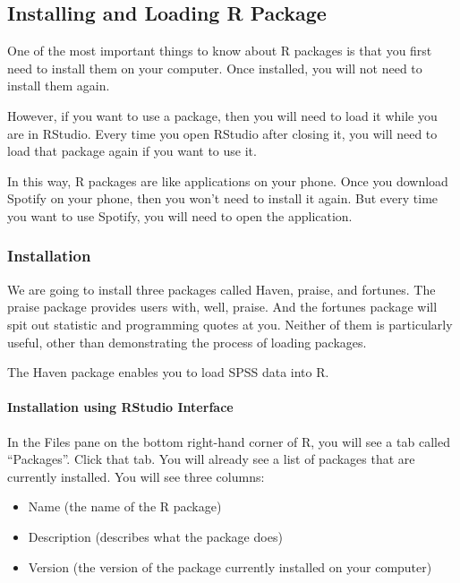 \documentclass[
]{book}
\begin{document}
\hypertarget{installing-and-loading-r-package}{%
\subsection{Installing and Loading R Package}\label{installing-and-loading-r-package}}

One of the most important things to know about R packages is that you first need to install them on your computer. Once installed, you will not need to install them again.

However, if you want to use a package, then you will need to load it while you are in RStudio. Every time you open RStudio after closing it, you will need to load that package again if you want to use it.

In this way, R packages are like applications on your phone. Once you download Spotify on your phone, then you won't need to install it again. But every time you want to use Spotify, you will need to open the application.

\hypertarget{installation}{%
\subsubsection{Installation}\label{installation}}

We are going to install three packages called Haven, praise, and fortunes. The praise package provides users with, well, praise. And the fortunes package will spit out statistic and programming quotes at you. Neither of them is particularly useful, other than demonstrating the process of loading packages.

The Haven package enables you to load SPSS data into R.

\hypertarget{installation-using-rstudio-interface}{%
\paragraph{Installation using RStudio Interface}\label{installation-using-rstudio-interface}}

In the Files pane on the bottom right-hand corner of R, you will see a tab called ``Packages''. Click that tab. You will already see a list of packages that are currently installed. You will see three columns:

\begin{itemize}
\item
  Name (the name of the R package)
\item
  Description (describes what the package does)
\item
  Version (the version of the package currently installed on your computer)
\end{itemize}
\end{document}

